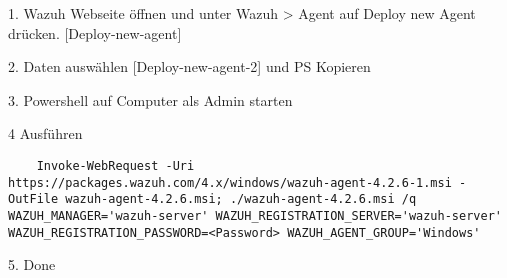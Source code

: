 1. Wazuh Webseite öffnen und unter Wazuh > Agent auf Deploy new Agent drücken. [Deploy-new-agent]

2. Daten auswählen [Deploy-new-agent-2] und PS Kopieren

3. Powershell auf Computer als Admin starten

4 Ausführen
\begin{lstlisting}
    Invoke-WebRequest -Uri https://packages.wazuh.com/4.x/windows/wazuh-agent-4.2.6-1.msi -OutFile wazuh-agent-4.2.6.msi; ./wazuh-agent-4.2.6.msi /q WAZUH_MANAGER='wazuh-server' WAZUH_REGISTRATION_SERVER='wazuh-server' WAZUH_REGISTRATION_PASSWORD=<Password> WAZUH_AGENT_GROUP='Windows' 
\end{lstlisting}

5. Done